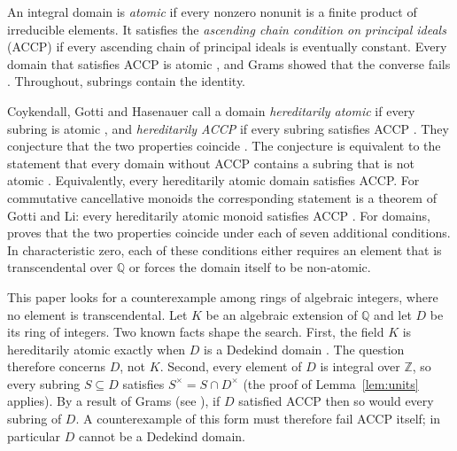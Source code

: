 \documentclass[11pt]{article}
\theoremstyle{plain}
\theoremstyle{definition}
\theoremstyle{remark}
\newcommand{\Z}{\mathbb Z}
\newcommand{\Q}{\mathbb Q}
\begin{document}
An integral domain is \emph{atomic} if every nonzero nonunit is a finite
product of irreducible elements.  It satisfies the \emph{ascending chain
condition on principal ideals} (ACCP) if every ascending chain of principal
ideals is eventually constant.  Every domain that satisfies ACCP is atomic
\cite[p.~2]{AAZ}, and Grams showed that the converse fails
\cite{Grams}.  Throughout, subrings contain the identity.

Coykendall, Gotti and Hasenauer call a domain \emph{hereditarily atomic} if
every subring is atomic \cite[Definition~2.1]{CGH}, and \emph{hereditarily
ACCP} if every subring satisfies ACCP \cite[Section~6]{CGH}.  They
conjecture that the two properties coincide \cite[Conjecture~6.1]{CGH}.
The conjecture is equivalent to the statement that every domain without
ACCP contains a subring that is not atomic \cite[Proposition~6.2]{CGH}.
Equivalently, every hereditarily atomic domain satisfies ACCP.  For
commutative cancellative monoids the corresponding statement is a theorem
of Gotti and Li: every hereditarily atomic monoid satisfies ACCP
\cite[Theorem~4.2]{GL}.  For domains, \cite[Theorem~6.4]{CGH} proves that
the two properties coincide under each of seven additional conditions.  In
characteristic zero, each of these conditions either requires an element
that is transcendental over $\Q$ or forces the domain itself to be
non-atomic.

This paper looks for a counterexample among rings of algebraic integers,
where no element is transcendental.  Let $K$ be an algebraic extension of
$\Q$ and let $D$ be its ring of integers.  Two known facts shape the
search.  First, the field $K$ is hereditarily atomic exactly when $D$ is a
Dedekind domain \cite[Theorem~4.4(1)]{CGH}.  The question therefore
concerns $D$, not $K$.  Second, every element of $D$ is integral over
$\Z$, so every subring $S\subseteq D$ satisfies $S^\times=S\cap D^\times$
(the proof of Lemma~\ref{lem:units} applies).  By a result of Grams (see \cite[Proposition~5.1]{CGH}),
if $D$ satisfied ACCP then so would every subring of $D$.  A counterexample
of this form must therefore fail ACCP itself; in particular $D$ cannot be
a Dedekind domain.
\end{document}
